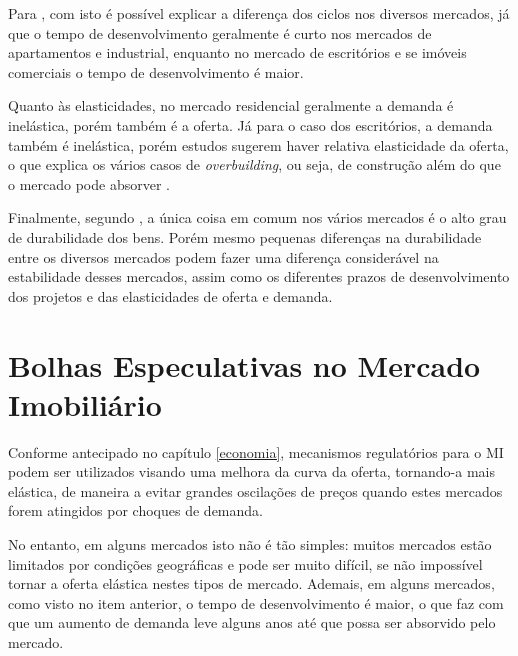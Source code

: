 \documentclass[
	12pt,				%
	oneside,			%
	a4paper,			%
	chapter=TITLE,		%
	section=TITLE,		%
	english,			%
	brazil				%
	]{abntex2}
\begin{document}
\begin{refsection}
Para \textcite[p.~228]{wheaton1999}, com isto é possível explicar a diferença dos ciclos
nos diversos mercados, já que o tempo de desenvolvimento geralmente é curto nos
mercados de apartamentos e industrial, enquanto no mercado de escritórios e se
imóveis comerciais o tempo de desenvolvimento é maior.

Quanto às elasticidades, no mercado residencial geralmente a demanda é
inelástica, porém também é a oferta. Já para o caso dos escritórios, a demanda
também é inelástica, porém estudos sugerem haver relativa elasticidade da oferta,
o que explica os vários casos de \emph{overbuilding}, ou seja, de construção além do
que o mercado pode absorver \autocite[p.~228]{wheaton1999}.

Finalmente, segundo \textcite[p.~228]{wheaton1999}, a única coisa em comum nos vários
mercados é o alto grau de durabilidade dos bens. Porém mesmo pequenas diferenças
na durabilidade entre os diversos mercados podem fazer uma diferença
considerável na estabilidade desses mercados, assim como os diferentes prazos de
desenvolvimento dos projetos e das elasticidades de oferta e demanda.

\hypertarget{bolhas-especulativas-no-mercado-imobiliuxe1rio}{%
\section{Bolhas Especulativas no Mercado Imobiliário}\label{bolhas-especulativas-no-mercado-imobiliuxe1rio}}

Conforme antecipado no capítulo \ref{economia}, mecanismos regulatórios para o
\gls{MI} podem ser utilizados visando uma melhora da curva da oferta, tornando-a
mais elástica, de maneira a evitar grandes oscilações de preços quando estes
mercados forem atingidos por choques de demanda.

No entanto, em alguns mercados isto não é tão simples: muitos mercados estão
limitados por condições geográficas e pode ser muito difícil, se não impossível
tornar a oferta elástica nestes tipos de mercado. Ademais, em alguns mercados,
como visto no item anterior, o tempo de desenvolvimento é maior, o que faz com
que um aumento de demanda leve alguns anos até que possa ser absorvido pelo
mercado.


\end{refsection}
\end{document}
